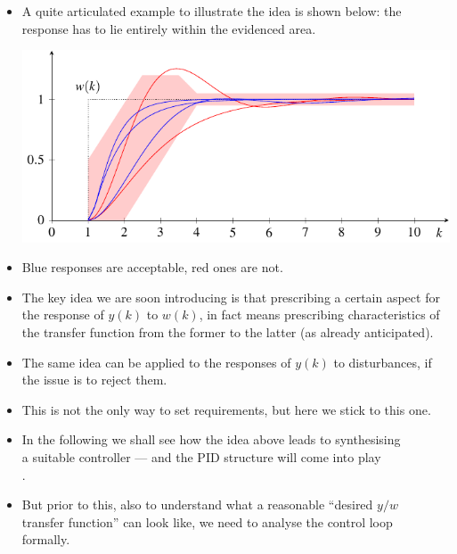 \begin{frame}
\framesubtitleTC{}
\myPause
 \begin{itemize}[<+-| alert@+>]
 \item A quite articulated example to illustrate the idea is shown below: the response has to lie
       entirely within the evidenced area.
       \begin{center}
        \includegraphics[width=0.60\columnwidth]{./Unit-04/img/StepRespWithConstraints-SP.pdf}
       \end{center}
 \item Blue responses are acceptable, red ones are not.
 \end{itemize}
\end{frame}


\begin{frame}
\framesubtitleTC{}
\myPause
 \begin{itemize}[<+-| alert@+>]
 \item The key idea we are soon introducing is that prescribing a certain aspect for the response
       of $y(k)$ to $w(k)$, in fact means prescribing characteristics of the transfer function
       from the former to the latter (as already anticipated).
 \item The same idea can be applied to the responses of $y(k)$ to disturbances, if the issue is to
       reject them.
 \item \vspace{3mm}This is not the only way to set requirements, but here we stick to this one.
 \item In the following we shall see how the idea above leads to synthesising\\
       a suitable controller --- and the PID structure will come into play\\
       .
 \item \vfill But prior to this, also to understand what a reasonable ``desired $y/w$\\
       transfer function'' can look like, we need to analyse the control loop\\
       formally.
 \end{itemize}
\end{frame}
